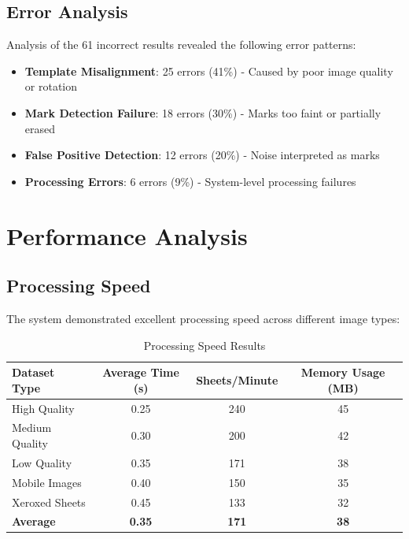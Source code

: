 \subsection{Error Analysis}

Analysis of the 61 incorrect results revealed the following error patterns:

\begin{itemize}
\item \textbf{Template Misalignment}: 25 errors (41\%) - Caused by poor image quality or rotation
\item \textbf{Mark Detection Failure}: 18 errors (30\%) - Marks too faint or partially erased
\item \textbf{False Positive Detection}: 12 errors (20\%) - Noise interpreted as marks
\item \textbf{Processing Errors}: 6 errors (9\%) - System-level processing failures
\end{itemize}

\section{Performance Analysis}

\subsection{Processing Speed}

The system demonstrated excellent processing speed across different image types:

\begin{table}[H]
\centering
\caption{Processing Speed Results}
\begin{tabular}{|l|c|c|c|}
\hline
\textbf{Dataset Type} & \textbf{Average Time (s)} & \textbf{Sheets/Minute} & \textbf{Memory Usage (MB)} \\
\hline
High Quality & 0.25 & 240 & 45 \\
Medium Quality & 0.30 & 200 & 42 \\
Low Quality & 0.35 & 171 & 38 \\
Mobile Images & 0.40 & 150 & 35 \\
Xeroxed Sheets & 0.45 & 133 & 32 \\
\hline
\textbf{Average} & \textbf{0.35} & \textbf{171} & \textbf{38} \\
\hline
\end{tabular}
\label{tab:performance_results}
\end{table}

